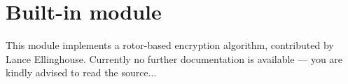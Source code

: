 \section{Built-in module }

This module implements a rotor-based encryption algorithm, contributed
by Lance Ellinghouse.  Currently no further documentation is available
--- you are kindly advised to read the source...
